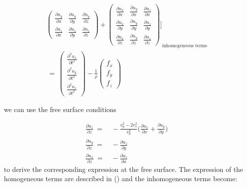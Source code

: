 \documentclass[]{article}
\begin{document}
\begin{align}
{\begin{pmatrix}
				\frac{\partial u_{y}}{\partial x} & \frac{\partial u_{y}}{\partial y} & \frac{\partial u_{y}}{\partial z}\\
				\frac{\partial u_{z}}{\partial x} & \frac{\partial u_{z}}{\partial y} & \frac{\partial u_{z}}{\partial z}
			\end{pmatrix}
			+
			\begin{pmatrix}
				\frac{\partial u_{x}}{\partial x} & \frac{\partial u_{y}}{\partial x} & \frac{\partial u_{z}}{\partial x}\\
				\frac{\partial u_{x}}{\partial y} & \frac{\partial u_{y}}{\partial y} & \frac{\partial u_{z}}{\partial y}\\
				\frac{\partial u_{x}}{\partial z} & \frac{\partial u_{y}}{\partial z} & \frac{\partial u_{z}}{\partial z}
			\end{pmatrix}
			\Bigg]}_\text{inhomogeneous terms} \\ \nonumber
		\: = \: 
		\begin{pmatrix}
			\frac{\partial^{2} u_{x}}{\partial t^{2}} \\
			\frac{\partial^{2} u_{y}}{\partial t^{2}} \\
			\frac{\partial^{2} u_{z}}{\partial t^{2}} 
		\end{pmatrix}
		- \frac{1}{\rho}
		\begin{pmatrix}
			f_{x}\\
			f_{y}\\
			f_{z}
		\end{pmatrix} %
		\label{eq4a_allterms}    
	\end{align} 
	
	we can use the free surface conditions 
	
	\begin{align}
		\frac{\partial u_{z}}{\partial z} \: =& \: - \frac{v_{p}^{2} - 2v_{s}^{2}}{v_{p}^{2}} \Big(\frac{\partial u_{x}}{\partial x} + \frac{\partial u_{y}}{\partial y}\Big)\\ 
		\frac{\partial u_{y}}{\partial z} \: =& \: - \frac{\partial u_{z}}{\partial y} \\
		\frac{\partial u_{x}}{\partial z} \: =& \: - \frac{\partial u_{z}}{\partial x}
	\end{align}\mbox{}
	to derive the corresponding expression at the free surface. The expression of the homogeneous terms are described in (\cite{curtis2002volumetric}) and the inhomogeneous terms become:
	
\end{document}
